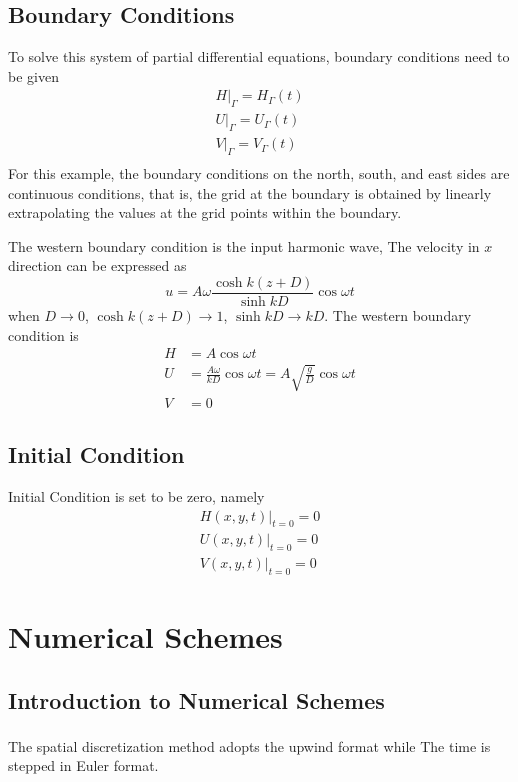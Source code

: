 \documentclass[10pt,a4paper]{article}
\newcommand{\upcite}[1]{\textsuperscript{\zihao{5}\cite{#1}}}
\begin{document}
\subsection{Boundary Conditions}\label{bc}
To solve this system of partial differential equations, boundary conditions need to be given
\begin{equation}
	\begin{aligned}
		H|_\Gamma = H_\Gamma (t)\\
		U|_\Gamma = U_\Gamma (t)\\
		V|_\Gamma = V_\Gamma (t)\\
	\end{aligned}
\end{equation}
For this example, the boundary conditions on the north, south, and east sides are continuous conditions, that is, the grid at the boundary is obtained by linearly extrapolating the values at the grid points within the boundary.

The western boundary condition is the input harmonic wave, The velocity in $x$ direction can be expressed as
\begin{equation}
	u = A\omega\frac{\cosh k(z+D)}{\sinh kD} \cos\omega t
\end{equation}
when $D\to0$, $\cosh k(z+D) \to 1$, $\sinh kD \to kD$. The western boundary condition is
\begin{equation}
	\begin{aligned}
		H &= A\cos\omega t\\
		U &= \frac{A\omega}{kD}\cos\omega t = A\sqrt{\frac{g}{D}}\cos\omega t\\
		V &= 0
	\end{aligned}
\end{equation}
\subsection{Initial Condition}
Initial Condition is set to be zero, namely
\begin{equation}
	\begin{aligned}
		H(x, y, t)|_{t= 0} = 0\\
		U(x, y, t)|_{t= 0} = 0\\
		V(x, y, t)|_{t= 0} = 0
	\end{aligned}
\end{equation}
\newpage
\section{Numerical Schemes}
\subsection{Introduction to Numerical Schemes}\label{spacedis}
The spatial discretization method adopts the upwind format \upcite{3} while The time is stepped in Euler format.
\end{document}
